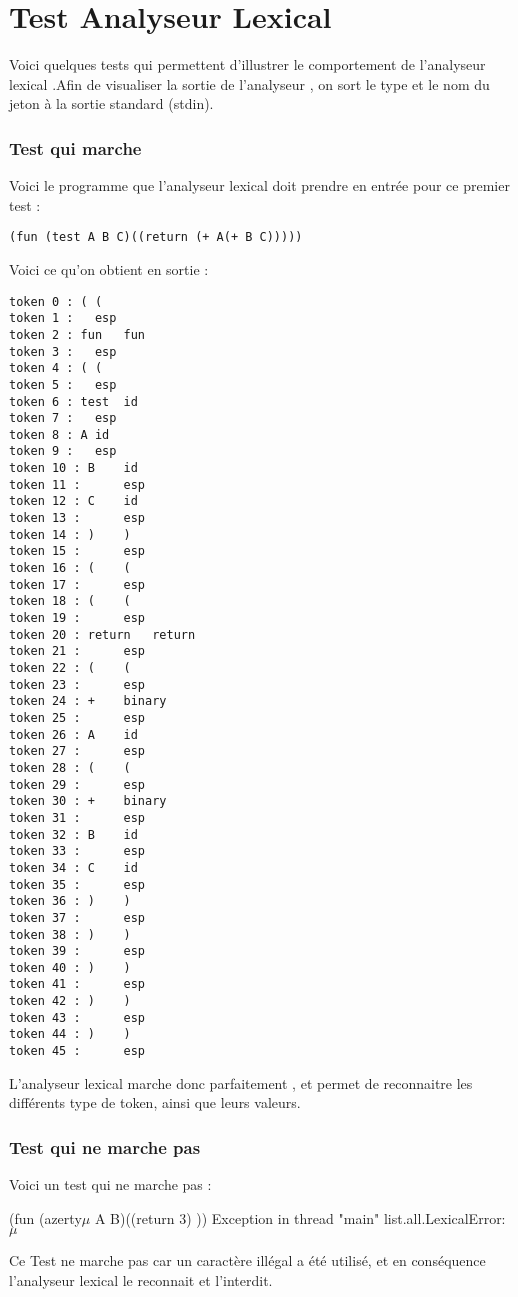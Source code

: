 \section{Test Analyseur Lexical}

Voici quelques tests qui permettent d'illustrer le comportement de l'analyseur lexical .Afin de visualiser la sortie de l'analyseur , on sort le type et le nom du jeton à la sortie standard (stdin).

\subsubsection{Test qui marche}
Voici le programme que l'analyseur lexical doit prendre en entrée pour ce premier test :
\begin{verbatim}
(fun (test A B C)((return (+ A(+ B C)))))
\end{verbatim}
Voici ce qu'on obtient en sortie :
{\tiny
\begin{verbatim}
token 0 : (	(
token 1 :  	esp
token 2 : fun	fun
token 3 :  	esp
token 4 : (	(
token 5 :  	esp
token 6 : test	id
token 7 :  	esp
token 8 : A	id
token 9 :  	esp
token 10 : B	id
token 11 :  	esp
token 12 : C	id
token 13 :  	esp
token 14 : )	)
token 15 :  	esp
token 16 : (	(
token 17 :  	esp
token 18 : (	(
token 19 :  	esp
token 20 : return	return
token 21 :  	esp
token 22 : (	(
token 23 :  	esp
token 24 : +	binary
token 25 :  	esp
token 26 : A	id
token 27 :  	esp
token 28 : (	(
token 29 :  	esp
token 30 : +	binary
token 31 :  	esp
token 32 : B	id
token 33 :  	esp
token 34 : C	id
token 35 :  	esp
token 36 : )	)
token 37 :  	esp
token 38 : )	)
token 39 :  	esp
token 40 : )	)
token 41 :  	esp
token 42 : )	)
token 43 :  	esp
token 44 : )	)
token 45 :  	esp
\end{verbatim}
}
L'analyseur lexical marche donc parfaitement , et permet de reconnaitre les différents type de token, ainsi que leurs valeurs.

\subsubsection{Test qui ne marche pas}

Voici un test qui ne marche pas :

(fun (azerty$\mu$ A B)((return 3) ))
Exception in thread "main" list.all.LexicalError: $\mu$


Ce Test ne marche pas car un caractère illégal a été utilisé, et en conséquence l'analyseur lexical le reconnait et l'interdit.


